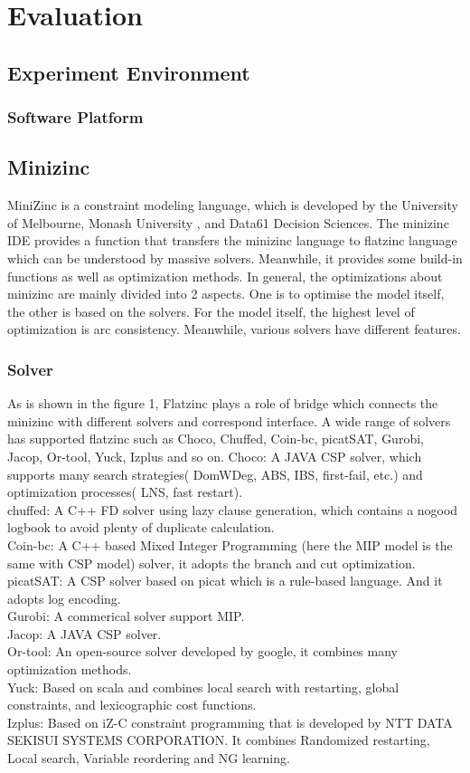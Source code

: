 \chapter{Evaluation}
\label{cha:evaluation}
\section{Experiment Environment}
\subsection{Software Platform}
\label{sec:softplat}
\section{Minizinc}
MiniZinc is a constraint modeling language, which is developed by the University of Melbourne, Monash University , and Data61 Decision Sciences\cite{r6}. The minizinc IDE provides a function that transfers the minizinc language to flatzinc language which can be understood by massive solvers\cite{r5}. Meanwhile, it provides some build-in functions as well as optimization methods. In general, the optimizations about minizinc are mainly divided into 2 aspects. One is to optimise the model itself, the other is based on the solvers. For the model itself, the highest level of optimization is arc consistency. Meanwhile, various solvers have different features.
\subsection{Solver}
As is shown in the figure 1, Flatzinc plays a role of bridge which connects the minizinc with different solvers and correspond interface. A wide range of solvers has supported flatzinc such as Choco, Chuffed, Coin-bc, picatSAT, Gurobi, Jacop, Or-tool, Yuck, Izplus and so on.
Choco: A JAVA CSP solver, which supports many search strategies( DomWDeg, ABS, IBS, first-fail, etc.) and optimization processes( LNS, fast restart).\\
chuffed: A C++ FD solver using lazy clause generation, which contains a nogood logbook to avoid plenty of duplicate calculation.\\
Coin-bc: A C++ based Mixed Integer Programming (here the MIP model is the same with CSP model) solver, it adopts the branch and cut optimization.\\
picatSAT: A CSP solver based on picat which is a rule-based language. And it adopts log encoding\cite{r8}.\\
Gurobi: A commerical solver support MIP.\\
Jacop: A JAVA CSP solver.\\
Or-tool: An open-source solver developed by google, it combines many optimization methods.\\
Yuck: Based on scala and combines local search with restarting, global constraints, and lexicographic cost functions.\\
Izplus: Based on iZ-C constraint programming that is developed by NTT DATA SEKISUI SYSTEMS CORPORATION. It combines Randomized restarting, Local search, Variable reordering and NG learning.

